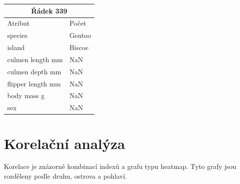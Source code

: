 \documentclass[10pt,xcolor=pdflatex,dvipsnames,table,oneside]{book}
\begin{document}
\begin{tabular}{|l|l|}
    \hline
    \multicolumn{2}{|c|}{Řádek 339} \\
    \hline
    \hline
    Atribut & Počet \\
    \hline
    \hline
    species           & Gentoo \\
    island            & Biscoe \\
    culmen length mm  &    NaN \\
    culmen depth mm   &    NaN \\
    flipper length mm &    NaN \\
    body mass g       &    NaN \\
    sex               &    NaN \\
    \hline
\end{tabular}

\section{Korelační analýza}
Korelace je znázorně kombinací indexů a grafu typu heatmap. Tyto grafy jsou rozděleny podle druhu, ostrova a pohlaví.
\end{document}
